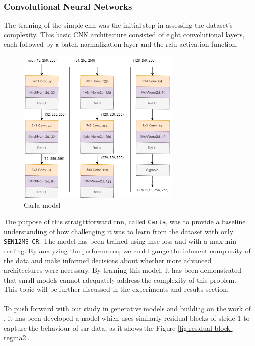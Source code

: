\subsubsection{Convolutional Neural Networks}
The training of the simple \gls{cnn} was the initial step in assessing the dataset's complexity. This basic CNN architecture consisted of eight convolutional layers, each followed by a batch normalization layer and the \gls{relu} activation function.
\begin{figure}[H]
	\centering
	\includegraphics[width=8cm]{imgs/models/models/cnn/CNN.png}
	\caption{Carla model}
	\label{fig:models-carla-loss}
\end{figure}
The purpose of this straightforward \gls{cnn}, called \texttt{Carla}, was to provide a baseline understanding of how challenging it was to learn from the dataset with only \texttt{SEN12MS-CR}. The model has been trained using \gls{mse} loss and with a max-min scaling. By analyzing the performance, we could gauge the inherent complexity of the data and make informed decisions about whether more advanced architectures were necessary. By training this model, it has been demonstrated that small models cannot adequately address the complexity of this problem. This topic will be further discussed in the experiments and results section.
\\
\\
To push forward with our study in generative models and building on the work of \cite{Meraner2020}, it has been developed a model which uses similarly residual blocks of stride 1 to capture the behaviour of \gls{sar} data, as it shows the Figure \ref{fig:residual-block-regina2}.
